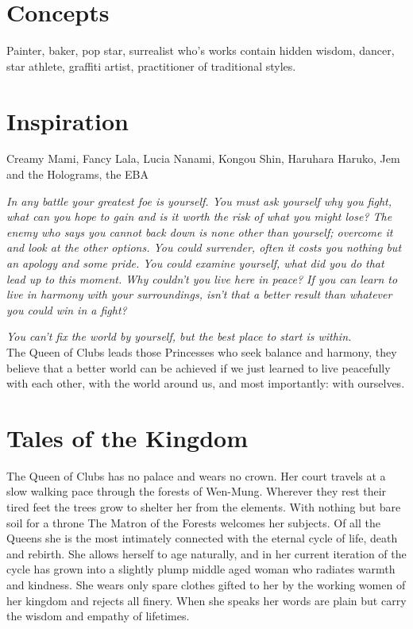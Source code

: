 \section*{Concepts}
Painter, baker, pop star, surrealist who's works contain hidden wisdom, dancer, star athlete, graffiti artist, practitioner of traditional styles. 

\section*{Inspiration}

Creamy Mami, Fancy Lala, Lucia Nanami, Kongou Shin, Haruhara Haruko, Jem and the Holograms, the EBA 



\newpage{}

\noindent \textit{In any battle your greatest foe is yourself. You must ask yourself why you fight, what can you hope to gain and is it worth the risk of what you might lose? The enemy who says you cannot back down is none other than yourself; overcome it and look at the other options. You could surrender, often it costs you nothing but an apology and some pride. You could examine yourself, what did you do that lead up to this moment. Why couldn't you live here in peace? If you can learn to live in harmony with your surroundings, isn't that a better result than whatever you could win in a fight?}

\textit{You can't fix the world by yourself, but the best place to start is within.}\\

\noindent The Queen of Clubs leads those Princesses who seek balance and harmony, they believe that a better world can be achieved if we just learned to live peacefully with each other, with the world around us, and most importantly: with ourselves. 

\section*{Tales of the Kingdom}
The Queen of Clubs has no palace and wears no crown. Her court travels at a slow walking pace through the forests of Wen-Mung. Wherever they rest their tired feet the trees grow to shelter her from the elements. With nothing but bare soil for a throne The Matron of the Forests welcomes her subjects. Of all the Queens she is the most intimately connected with the eternal cycle of life, death and rebirth. She allows herself to age naturally, and in her current iteration of the cycle has grown into a slightly plump middle aged woman who radiates warmth and kindness. She wears only spare clothes gifted to her by the working women of her kingdom and rejects all finery. When she speaks her words are plain but carry the wisdom and empathy of lifetimes.


